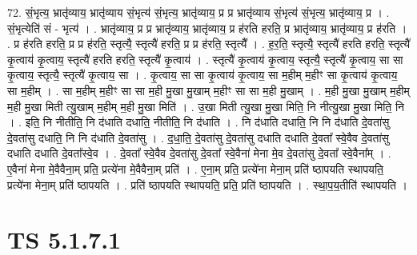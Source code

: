 \documentclass[17pt]{extarticle}
\begin{document}
72. सं॒भृत्य॒ भ्रातृ॑व्याय॒ भ्रातृ॑व्याय सं॒भृत्य॑ सं॒भृत्य॒ भ्रातृ॑व्याय॒ प्र प्र भ्रातृ॑व्याय सं॒भृत्य॑ सं॒भृत्य॒ भ्रातृ॑व्याय॒ प्र । . सं॒भृत्येति॑ सं - भृत्य॑ । . भ्रातृ॑व्याय॒ प्र प्र भ्रातृ॑व्याय॒ भ्रातृ॑व्याय॒ प्र ह॑रति हरति॒ प्र भ्रातृ॑व्याय॒ भ्रातृ॑व्याय॒ प्र ह॑रति । . प्र ह॑रति हरति॒ प्र प्र ह॑रति॒ स्तृत्यै॒ स्तृत्यै॑ हरति॒ प्र प्र ह॑रति॒ स्तृत्यै᳚ । . ह॒र॒ति॒ स्तृत्यै॒ स्तृत्यै॑ हरति हरति॒ स्तृत्यै॑ कृ॒त्वाय॑ कृ॒त्वाय॒ स्तृत्यै॑ हरति हरति॒ स्तृत्यै॑ कृ॒त्वाय॑ । . स्तृत्यै॑ कृ॒त्वाय॑ कृ॒त्वाय॒ स्तृत्यै॒ स्तृत्यै॑ कृ॒त्वाय॒ सा सा कृ॒त्वाय॒ स्तृत्यै॒ स्तृत्यै॑ कृ॒त्वाय॒ सा । . कृ॒त्वाय॒ सा सा कृ॒त्वाय॑ कृ॒त्वाय॒ सा म॒हीम् म॒हीꣳ सा कृ॒त्वाय॑ कृ॒त्वाय॒ सा म॒हीम् । . सा म॒हीम् म॒हीꣳ सा सा म॒ही मु॒खा मु॒खाम् म॒हीꣳ सा सा म॒ही मु॒खाम् । . म॒ही मु॒खा मु॒खाम् म॒हीम् म॒ही मु॒खा मिती त्यु॒खाम् म॒हीम् म॒ही मु॒खा मिति॑ । . उ॒खा मिती त्यु॒खा मु॒खा मिति॒ नि नीत्यु॒खा मु॒खा मिति॒ नि । . इति॒ नि नीतीति॒ नि द॑धाति दधाति॒ नीतीति॒ नि द॑धाति । . नि द॑धाति दधाति॒ नि नि द॑धाति दे॒वता॑सु दे॒वता॑सु दधाति॒ नि नि द॑धाति दे॒वता॑सु । . द॒धा॒ति॒ दे॒वता॑सु दे॒वता॑सु दधाति दधाति दे॒वता᳚ स्वे॒वैव दे॒वता॑सु दधाति दधाति दे॒वता᳚स्वे॒व । . दे॒वता᳚ स्वे॒वैव दे॒वता॑सु दे॒वता᳚ स्वे॒वैना॑ मेना मे॒व दे॒वता॑सु दे॒वता᳚ स्वे॒वैना᳚म् । . ए॒वैना॑ मेना मे॒वैवैना॒म् प्रति॒ प्रत्ये॑ना मे॒वैवैना॒म् प्रति॑ । . ए॒ना॒म् प्रति॒ प्रत्ये॑ना मेना॒म् प्रति॑ ष्ठापयति स्थापयति॒ प्रत्ये॑ना मेना॒म् प्रति॑ ष्ठापयति । . प्रति॑ ष्ठापयति स्थापयति॒ प्रति॒ प्रति॑ ष्ठापयति । . स्था॒प॒य॒तीति॑ स्थापयति । \newline
\pagebreak
{}

\section{ TS 5.1.7.1 }
\end{document}
